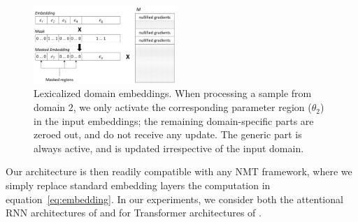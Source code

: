 \documentclass[11pt,a4paper]{article}
\begin{document}
\begin{figure}
  \center
  \includegraphics[width=0.48\textwidth]{embeddings}
  \caption{Lexicalized domain embeddings. When processing a sample from domain $2$, we only activate the corresponding parameter region ($\theta_2$) in the input embeddings; the remaining domain-specific parts are zeroed out, and do not receive any update. The generic part is always active, and is updated irrespective of the input domain.} 
  \label{fig:network}
\end{figure}

Our architecture is then readily compatible with any NMT framework, where we simply replace standard embedding layers the computation in equation~\eqref{eq:embedding}. In our experiments, we consider both the attentional RNN architectures of \citet{Bahdanau15learning} and for Transformer architectures of \citet{Vaswani17attention}.

\end{document}
